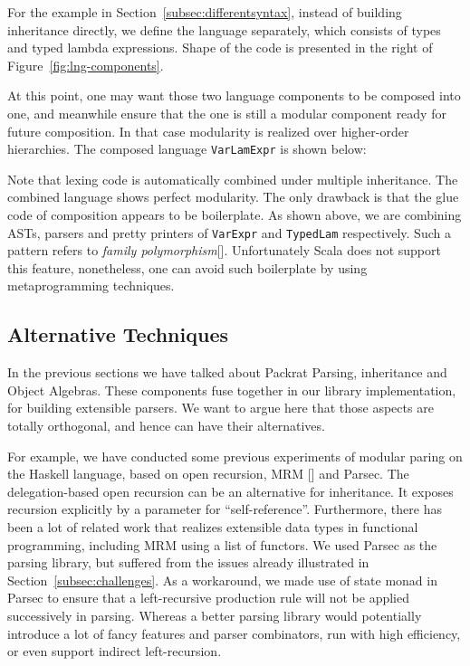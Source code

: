 For the example in Section~\ref{subsec:differentsyntax}, instead of building inheritance directly, we define the language separately,
which consists of types and typed lambda expressions. Shape of the code is presented in the right of Figure~\ref{fig:lng-components}.

At this point, one may want those two language components to be composed into one, and meanwhile ensure that the one is still a modular
component ready for future composition. In that case modularity is realized over higher-order hierarchies. The composed language \lstinline{VarLamExpr}
is shown below:

Note that lexing code is automatically combined under multiple inheritance. The combined language shows perfect modularity. The only
drawback is that the glue code of composition appears to be boilerplate. As shown above, we are combining ASTs, parsers and pretty printers of
\lstinline{VarExpr} and \lstinline{TypedLam} respectively. Such a pattern refers to \textit{family polymorphism}[]. Unfortunately Scala does not
support this feature, nonetheless, one can avoid such boilerplate by using metaprogramming techniques.

\subsection{Alternative Techniques}
In the previous sections we have talked about Packrat Parsing, inheritance and Object Algebras. These components fuse together in our library implementation, for building extensible parsers. We want to argue here that those aspects are totally orthogonal, and hence can have their alternatives.

For example, we have conducted some previous experiments of modular paring on the Haskell language, based on open recursion, MRM [] and Parsec.  The delegation-based open recursion can be an alternative for inheritance. It exposes recursion explicitly by a parameter for ``self-reference''.
Furthermore, there has been a lot of related work that realizes extensible data types in functional programming, including MRM using a list of functors. We used Parsec as the parsing library, but suffered from the issues already illustrated in Section~\ref{subsec:challenges}. As a workaround, we made use of state monad in Parsec to ensure that a left-recursive production rule will not be applied successively in parsing. Whereas a better
parsing library would potentially introduce a lot of fancy features and parser combinators, run with high efficiency, or even support indirect left-recursion.
